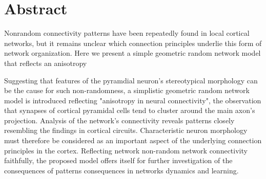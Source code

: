 \section*{Abstract}
%
Nonrandom connectivity patterns have been repeatedly found in local cortical
networks, but it remains unclear which connection principles underlie this form of network organization. Here we present a simple geometric random network model that reflects an anisotropy

Suggesting that features of the pyramdial neuron's
stereotypical morphology can be the cause for such non-randomness, a
simplistic geometric random network model is introduced reflecting
"anisotropy in neural connectivity", the observation that synapses of
cortical pyramidal cells tend to cluster around the main axon's
projection. Analysis of the network's connectivity reveals patterns
closely resembling the findings in cortical circuits. Characteristic
neuron morphology must therefore be considered as an important aspect
of the underlying connection principles in the cortex. Reflecting
network non-random network connectivity faithfully, the proposed model
offers itself for further investigation of the consequences of
patterns consequences in networks dynamics and learning.


